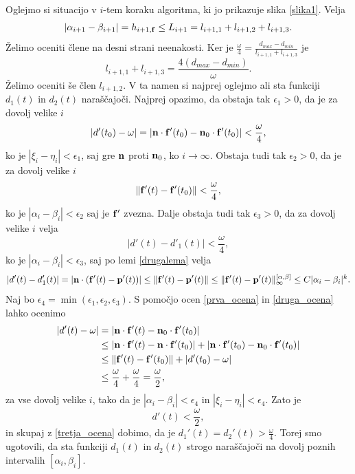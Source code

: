 Oglejmo si situacijo v $i$-tem koraku algoritma, ki jo prikazuje slika \textcolor{red}{\ref{slika1}}. Velja 
$$
|\alpha _{i+1}-\beta _{i+1}| = h_{i+1,{\bf f}} \leq L_{i+1} = l_{i+1,1} + l_{i+1,2} + l_{i+1,3}.
$$
Želimo oceniti člene na desni strani neenakosti. Ker je $\frac{\omega}{4} = \frac{d_{max}-d_{min}}{l_{i+1,1}  + l_{i+1,3}}$ je
\begin{equation}
l_{i+1,1}  + l_{i+1,3} = \frac{4(d_{max} - d_{min})}{\omega}.
\end{equation}
Želimo oceniti še člen $l_{i+1,2}$. V ta namen si najprej oglejmo ali sta funkciji $d_1(t)$ in $d_2(t)$ naraščajoči. Najprej opazimo, da obstaja tak $\epsilon _1>0$, da je za dovolj velike $i$  
\begin{equation}\label{prva_ocena}
|d'(t_0) - \omega| = |{\bf n}\cdot {\bf f}'(t_0) - {\bf n}_0 \cdot {\bf f}'(t_0)| < \frac{\omega}{4},
\end{equation}
ko je $|\xi _i - \eta _i| < \epsilon _1$, saj gre ${\bf n}$ proti ${\bf n}_0$, ko $i\rightarrow\infty$. Obstaja tudi tak $\epsilon _2 > 0$, da je za dovolj velike $i$
\begin{equation}\label{druga_ocena}
\lVert {\bf f}'(t) - {\bf f}'(t_0)\rVert < \frac{\omega}{4},
\end{equation}
ko je $|\alpha _i - \beta _i| < \epsilon _2$ saj je ${\bf f}'$ zvezna. Dalje obstaja tudi tak $\epsilon _3 > 0$, da za dovolj velike $i$ velja
\begin{equation}\label{tretja_ocena}
|d'(t)-d'_1(t)| < \frac{\omega}{4},
\end{equation}
ko je $|\alpha _i - \beta _i| < \epsilon _3$, saj po lemi \ref{drugalema} velja
$$
|d'(t)-d'_1(t)| = |{\bf n}\cdot ({\bf f}'(t) - {\bf p}'(t))| \leq \lVert {\bf f}'(t) - {\bf p}'(t) \rVert \leq \lVert {\bf f}'(t) - {\bf p}'(t) \rVert _{\infty}^{[\alpha,\beta]} \leq C|\alpha _i- \beta_i|^k.
$$
Naj bo $\epsilon _4 = \min (\epsilon _1, \epsilon _2, \epsilon _3)$. S pomočjo ocen \ref{prva_ocena} in \ref{druga_ocena} lahko ocenimo
\begin{equation*}
\begin{split}
|d'(t)-\omega| & = |{\bf n}\cdot {\bf f}'(t) - {\bf n}_0\cdot{\bf f}'(t_0)| \\
& \leq |{\bf n}\cdot {\bf f}'(t) - {\bf n}\cdot{\bf f}'(t_0)| + 
|{\bf n}\cdot {\bf f}'(t_0) - {\bf n}_0\cdot{\bf f}'(t_0)|\\
&\leq \lVert {\bf f}'(t) - {\bf f}'(t_0)\rVert + |d'(t_0)-\omega|\\
&\leq \frac{\omega}{4} + \frac{\omega}{4} = \frac{\omega}{2},
\end{split}
\end{equation*}
za vse dovolj velike $i$, tako da je $|\alpha _i-\beta _i| < \epsilon _4$ in $|\xi _i - \eta _i| < \epsilon _4$. Zato je 
\begin{equation}\label{ocena_omega}
d'(t)<\frac{\omega}{2},
\end{equation}
 in skupaj z \ref{tretja_ocena} dobimo, da je $d_1'(t) = d_2'(t) > \frac{\omega}{4}$. Torej smo ugotovili, da sta funkciji $d_1(t)$ in $d_2(t)$ strogo naraščajoči na dovolj poznih intervalih $[\alpha _i, \beta _i]$.

